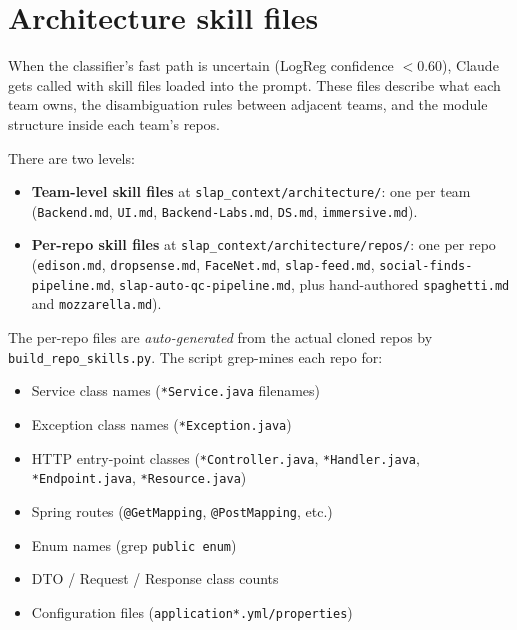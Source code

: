 \documentclass[11pt,a4paper]{article}
\begin{document}
\newpage

\section{Architecture skill files}

When the classifier's fast path is uncertain (LogReg confidence $<0.60$),
Claude gets called with skill files loaded into the prompt. These files
describe what each team owns, the disambiguation rules between adjacent
teams, and the module structure inside each team's repos.

There are two levels:

\begin{itemize}[leftmargin=1.4em,nosep]
\item \textbf{Team-level skill files} at \texttt{slap\_context/architecture/}:
      one per team ({\tt Backend.md}, {\tt UI.md}, {\tt Backend-Labs.md},
      {\tt DS.md}, {\tt immersive.md}).
\item \textbf{Per-repo skill files} at
      \texttt{slap\_context/architecture/repos/}: one per repo
      ({\tt edison.md}, {\tt dropsense.md}, {\tt FaceNet.md},
      {\tt slap-feed.md}, {\tt social-finds-pipeline.md},
      {\tt slap-auto-qc-pipeline.md}, plus hand-authored
      {\tt spaghetti.md} and {\tt mozzarella.md}).
\end{itemize}

The per-repo files are \emph{auto-generated} from the actual cloned repos
by \texttt{build\_repo\_skills.py}. The script grep-mines each repo for:

\begin{itemize}[leftmargin=1.4em,nosep]
\item Service class names (\texttt{*Service.java} filenames)
\item Exception class names (\texttt{*Exception.java})
\item HTTP entry-point classes (\texttt{*Controller.java},
      \texttt{*Handler.java}, \texttt{*Endpoint.java}, \texttt{*Resource.java})
\item Spring routes (\texttt{@GetMapping}, \texttt{@PostMapping}, etc.)
\item Enum names (grep \texttt{public enum})
\item DTO / Request / Response class counts
\item Configuration files (\texttt{application*.yml/properties})
\end{itemize}
\end{document}
